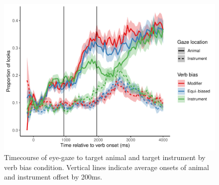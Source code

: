 \documentclass[
  man,floatsintext]{apa6}
\begin{document}
\begin{figure}
\centering
\includegraphics{manuscript_files/figure-latex/E4-gaze-timecourse-fig-1.pdf}
\caption{\label{fig:E4-gaze-timecourse-fig}Timecourse of eye-gaze to target animal and target instrument by verb bias condition. Vertical lines indicate average onsets of animal and instrument offset by 200ms.}
\end{figure}
\end{document}
